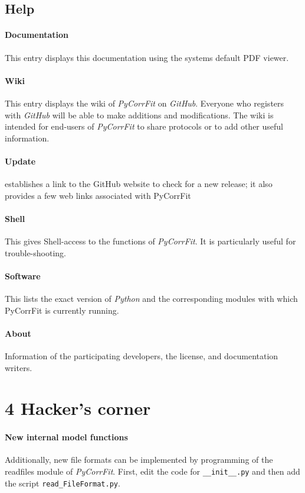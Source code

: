 \subsection{Help}
\paragraph*{Documentation}
This entry displays this documentation using the systems default PDF viewer.
\paragraph*{Wiki}
This entry displays the wiki of \textit{PyCorrFit} on \textit{GitHub}. Everyone who registers with \textit{GitHub} will be able to make additions and modifications. The wiki is intended for end-users of \textit{PyCorrFit} to share protocols or to add other useful information.
\paragraph*{Update}
establishes a link to the GitHub website to check for a new release; it also provides a few web links associated with PyCorrFit
\paragraph*{Shell}
This gives Shell-access to the functions of \textit{PyCorrFit}. It is particularly useful for trouble-shooting.
\paragraph*{Software}
This lists the exact version of \textit{Python} and the corresponding modules with which PyCorrFit is currently running.
\paragraph*{About}
Information of the participating developers, the license, and documentation writers.


\section{4 Hacker's corner}
\label{sec:hacke}
\paragraph*{New internal model functions}
Additionally, new file formats can be implemented by programming of the readfiles module of \textit{PyCorrFit}. First, edit the code for \texttt{\_\_init\_\_.py} and then add the script \texttt{read\_FileFormat.py}.

